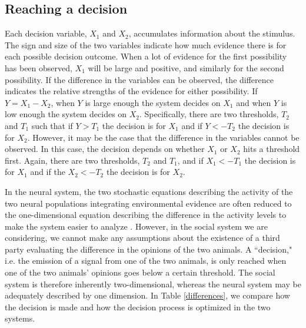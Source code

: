 \documentclass{article}
\begin{document}
\subsection{Reaching a decision }
Each decision variable, $X_1$ and $X_2$, accumulates information about the stimulus.  The sign and size of the two variables indicate how much evidence there is for each possible decision outcome.  When a lot of evidence for the first possibility has been observed, $X_1$ will be large and positive, and similarly for the second possibility.  If the difference in the variables can be observed, the difference indicates the relative strengths of the evidence for either possibility. If $Y=X_1-X_2$, when $Y$ is large enough the system decides on $X_1$ and when $Y$ is low enough the system decides on $X_2$.  Specifically, there are two thresholds, $T_2$ and $T_1$ such that if $Y>T_1$ the decision is for $X_1$ and if $Y<-T_2$ the decision is for $X_2$.  However, it may be the case that the difference in the variables cannot be observed.  In this case, the decision depends on whether $X_1$ or $X_2$ hits a threshold first.  Again, there are two thresholds, $T_2$ and $T_1$, and if $X_1<-T_1$ the decision is for $X_1$ and if the $X_2<-T_2$ the decision is for $X_2$. 

In the neural system, the two stochastic equations describing the activity of the two neural populations integrating environmental evidence are often reduced to the one-dimensional equation describing the difference in the activity levels to make the system easier to analyze \cite{Brown:2005fk,Bogacz:2006uq,Feng:2009kl}.  However, in the social system we are considering, we cannot make any assumptions about the existence of a third party evaluating the difference in the opinions of the two animals.  A ``decision," i.e. the emission of a signal from one of the two animals, is only reached when one of the two animals' opinions goes below a certain threshold.  The social system is therefore inherently two-dimensional, whereas the neural system may be adequately described by one dimension.  In Table \ref{differences}, we compare how the decision is made and how the decision process is optimized in the two systems.
\end{document}
